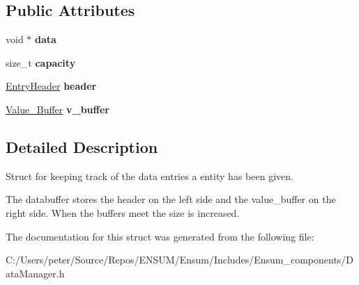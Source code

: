 \subsection*{Public Attributes}
\begin{DoxyCompactItemize}
\item 
void $\ast$ {\bfseries data}\hypertarget{struct_ensum_1_1_components_1_1_data_manager_1_1_data_buffer_a9297555e082ec773d4e49060df1c6a91}{}\label{struct_ensum_1_1_components_1_1_data_manager_1_1_data_buffer_a9297555e082ec773d4e49060df1c6a91}

\item 
size\+\_\+t {\bfseries capacity}\hypertarget{struct_ensum_1_1_components_1_1_data_manager_1_1_data_buffer_a386af07a3b4373ec96e67f58a5a33f78}{}\label{struct_ensum_1_1_components_1_1_data_manager_1_1_data_buffer_a386af07a3b4373ec96e67f58a5a33f78}

\item 
\hyperlink{struct_ensum_1_1_components_1_1_data_manager_1_1_entry_header}{Entry\+Header} {\bfseries header}\hypertarget{struct_ensum_1_1_components_1_1_data_manager_1_1_data_buffer_a49547b879ac0083ade12a7488c1b74d9}{}\label{struct_ensum_1_1_components_1_1_data_manager_1_1_data_buffer_a49547b879ac0083ade12a7488c1b74d9}

\item 
\hyperlink{struct_ensum_1_1_components_1_1_data_manager_1_1_value___buffer}{Value\+\_\+\+Buffer} {\bfseries v\+\_\+buffer}\hypertarget{struct_ensum_1_1_components_1_1_data_manager_1_1_data_buffer_a08464c56ea3a4a5fc34b3cb87534fbe0}{}\label{struct_ensum_1_1_components_1_1_data_manager_1_1_data_buffer_a08464c56ea3a4a5fc34b3cb87534fbe0}

\end{DoxyCompactItemize}


\subsection{Detailed Description}
Struct for keeping track of the data entries a entity has been given. 

The databuffer stores the header on the left side and the value\+\_\+buffer on the right side. When the buffers meet the size is increased. 

The documentation for this struct was generated from the following file\+:\begin{DoxyCompactItemize}
\item 
C\+:/\+Users/peter/\+Source/\+Repos/\+E\+N\+S\+U\+M/\+Ensum/\+Includes/\+Ensum\+\_\+components/Data\+Manager.\+h\end{DoxyCompactItemize}
